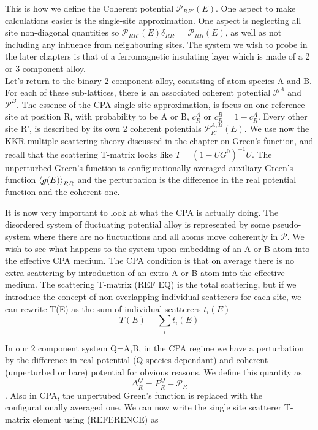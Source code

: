 \documentclass[12pt]{article}
\begin{document}
This is how we define the Coherent potential $\mathcal{P}_{RR'}(E)$. One aspect to make calculations easier is the single-site approximation. One aspect is neglecting all site non-diagonal quantities so $\mathcal{P}_{RR'}(E)\delta_{RR'}=\mathcal{P}_{RR}(E)$, as well as not including any influence from neighbouring sites. The system we wish to probe in the later chapters is that of a ferromagnetic insulating layer which is made of a 2 or 3 component alloy. 
\\Let's return to the binary 2-component alloy, consisting of atom species A and B. For each of these sub-lattices, there is an associated coherent potential $\mathcal{P}^A$ and $\mathcal{P}^B$. The essence of the CPA single site approximation, is focus on one reference site at position R, with probability to be A or B, $c_R^A$ or $c_R^B=1-c_R^A$. Every other site R', is described by its own 2 coherent potentials $\mathcal{P}_{R'}^{A,B}(E)$. We use now the KKR multiple scattering theory discussed in the chapter on Green's function, and recall that the scattering T-matrix looks like $T=(1-UG^0)^{-1}U$. The unperturbed Green's function is configurationally averaged auxiliary Green's function $\expval{g(E)}_{RR}$ and the perturbation is the difference in the real potential function and the coherent one. 




It is now very important to look at what the CPA is actually doing. The disordered system of fluctuating potential alloy is represented by some pseudo-system where there are no fluctuations and all atoms move coherently in $\mathcal{P}$. We wish to see what happens to the system upon embedding of an A or B atom into the effective CPA medium. The CPA condition is that on average there is no extra scattering by introduction of an extra A or B atom into the effective medium. The scattering T-matrix (REF EQ) is the total scattering, but if we introduce the concept of non overlapping individual scatterers for each site, we can rewrite T(E) as the sum of individual scatterers $t_i(E)$
$$T(E)=\sum_it_i(E)$$

In our 2 component system Q=A,B, in the CPA regime we have a perturbation by the difference in real potential (Q species dependant) and coherent (unperturbed or bare) potential for obvious reasons. We define this quantity as $$\Delta^Q_R=P_R^Q-\mathcal{P}_R$$. Also in CPA, the unpertubed Green's function is replaced with the configurationally averaged one. We can now write the single site scatterer T-matrix element using (REFERENCE) as 
\end{document}
